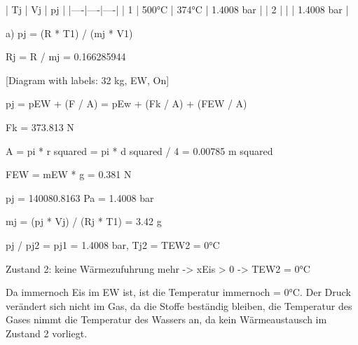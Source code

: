 | Tj | Vj | pj |
|----|----|----|
| 1  | 500°C | 374°C | 1.4008 bar |
| 2  |       |       | 1.4008 bar |

a) pj = (R * T1) / (mj * V1)

Rj = R / mj = 0.166285944

[Diagram with labels: 32 kg, EW, On]

pj = pEW + (F / A) = pEw + (Fk / A) + (FEW / A)

Fk = 373.813 N

A = pi * r squared = pi * d squared / 4 = 0.00785 m squared

FEW = mEW * g = 0.381 N

pj = 140080.8163 Pa = 1.4008 bar

mj = (pj * Vj) / (Rj * T1) = 3.42 g

pj / pj2 = pj1 = 1.4008 bar, Tj2 = TEW2 = 0°C

Zustand 2: keine Wärmezufuhrung mehr -> xEis > 0 -> TEW2 = 0°C

Da immernoch Eis im EW ist, ist die Temperatur immernoch = 0°C. Der Druck verändert sich nicht im Gas, da die Stoffe beständig bleiben, die Temperatur des Gases nimmt die Temperatur des Wassers an, da kein Wärmeaustausch im Zustand 2 vorliegt.
